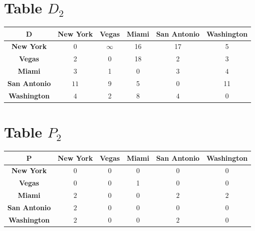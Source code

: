 \documentclass{article}
\begin{document}
\section{Table $D_{2}$}
\begin{center}
    \begin{tabular}{|c||c|c|c|c|c|}
        \hline
        \textbf{D} & \textbf{New York} & \textbf{Vegas} & \textbf{Miami} & \textbf{San Antonio} & \textbf{Washington} \\
        \hline
        \hline
        \textbf{New York}& 0 & $\infty$ & 16 & 17 & 5 \\
        \hline
        \textbf{Vegas}& 2 & 0 & 18 & 2 & 3 \\
        \hline
        \textbf{Miami}& \cellcolor[HTML]{D74894}$3$ & 1 & 0 & \cellcolor[HTML]{D74894}$3$ & \cellcolor[HTML]{D74894}$4$ \\
        \hline
        \textbf{San Antonio}& \cellcolor[HTML]{D74894}$11$ & 9 & 5 & 0 & 11 \\
        \hline
        \textbf{Washington}& \cellcolor[HTML]{D74894}$4$ & 2 & 8 & \cellcolor[HTML]{D74894}$4$ & 0 \\
        \hline
    \end{tabular}
\end{center}


\section{Table $P_{2}$}
\begin{center}
    \begin{tabular}{|c||c|c|c|c|c|}
        \hline
        \textbf{P} & \textbf{New York} & \textbf{Vegas} & \textbf{Miami} & \textbf{San Antonio} & \textbf{Washington} \\
        \hline
        \hline
        \textbf{New York}& 0 & 0 & 0 & 0 & 0 \\
        \hline
        \textbf{Vegas}& 0 & 0 & 1 & 0 & 0 \\
        \hline
        \textbf{Miami}& \cellcolor[HTML]{D74894}$2$ & 0 & 0 & \cellcolor[HTML]{D74894}$2$ & \cellcolor[HTML]{D74894}$2$ \\
        \hline
        \textbf{San Antonio}& \cellcolor[HTML]{D74894}$2$ & 0 & 0 & 0 & 0 \\
        \hline
        \textbf{Washington}& \cellcolor[HTML]{D74894}$2$ & 0 & 0 & \cellcolor[HTML]{D74894}$2$ & 0 \\
        \hline
    \end{tabular}
\end{center}
\end{document}
